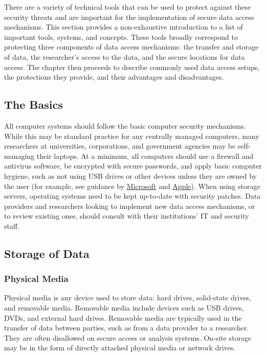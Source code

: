 There are a variety of technical tools that can be used to protect against these security threats and are important for the implementation of secure data access mechanisms. This section provides a non-exhaustive introduction to a list of important tools, systems, and concepts. These tools broadly correspond to protecting three components of data access mechanisms: the transfer and storage of data, the researcher's access to the data, and the secure locations for data access. The chapter then proceeds to describe commonly used data access setups, the protections they provide, and their advantages and disadvantages.

\hypertarget{the-basics}{%
\subsection{The Basics}\label{the-basics}}

All computer systems should follow the basic computer security mechanisms. While this may be standard practice for any centrally managed computers, many researchers at universities, corporations, and government agencies may be self-managing their laptops. At a minimum, all computers should use a firewall and antivirus software, be encrypted with secure passwords, and apply basic computer hygiene, such as not using USB drives or other devices unless they are owned by the user (for example, see guidance by \href{https://support.microsoft.com/en-us/help/4092060/windows-keep-your-computer-secure-at-home}{Microsoft} and \href{https://support.apple.com/en-ca/guide/mac-help/flvlt003/mac}{Apple}). When using storage servers, operating systems need to be kept up-to-date with security patches. Data providers and researchers looking to implement new data access mechanisms, or to review existing ones, should consult with their institutions' IT and security staff.

\hypertarget{storage-of-data}{%
\subsection{Storage of Data}\label{storage-of-data}}

\hypertarget{physical-media}{%
\subsubsection{Physical Media}\label{physical-media}}

Physical media is any device used to store data: hard drives, solid-state drives, and removable media. Removable media include devices such as USB drives, DVDs, and external hard drives. Removable media are typically used in the transfer of data between parties, such as from a data provider to a researcher. They are often disallowed on secure access or analysis systems. On-site storage may be in the form of directly attached physical media or network drives.

